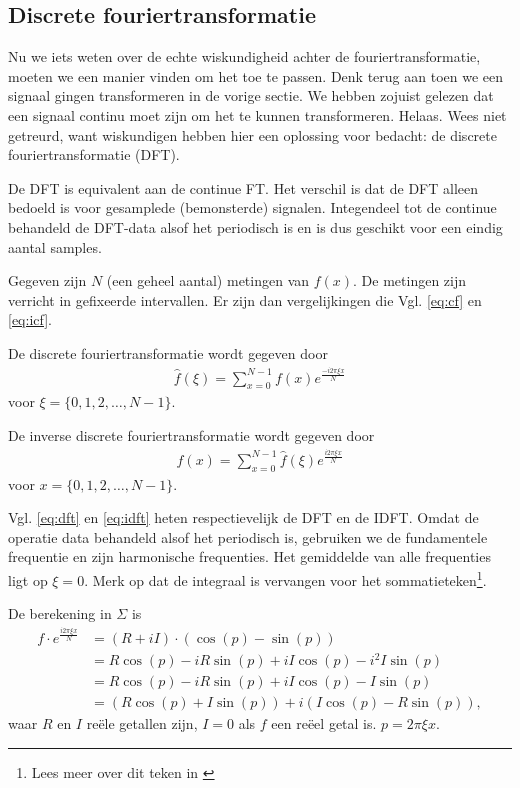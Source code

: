 \documentclass[11pt,fleqn]{book} %
\begin{document}
\subsection{Discrete fouriertransformatie}
Nu we iets weten over de echte wiskundigheid achter de fouriertransformatie, moeten we een manier vinden om het toe te passen. Denk terug aan toen we een signaal gingen transformeren in de vorige sectie. We hebben zojuist gelezen dat een signaal continu moet zijn om het te kunnen transformeren. Helaas. Wees niet getreurd, want wiskundigen hebben hier een oplossing voor bedacht: de discrete fouriertransformatie (DFT).

De DFT is equivalent aan de continue FT. Het verschil is dat de DFT alleen bedoeld is voor gesamplede (bemonsterde) signalen. Integendeel tot de continue behandeld de DFT-data alsof het periodisch is en is dus geschikt voor een eindig aantal samples.

Gegeven zijn $N$ (een geheel aantal) metingen van $f(x)$. De metingen zijn verricht in gefixeerde intervallen. Er zijn dan vergelijkingen die Vgl. \ref{eq:cf} en \ref{eq:icf}.
\begin{definition} \label{eq:dft}
De discrete fouriertransformatie wordt gegeven door
\begin{align}
\hat{f}(\xi)=\sum_{x=0}^{N-1} f(x)e^{\frac{-i2\pi \xi x}{N}}
\end{align}
voor $\xi=\{0, 1, 2, \ldots, N-1\}$.
\end{definition}
\begin{definition} \label{eq:idft}
De inverse discrete fouriertransformatie wordt gegeven door
\begin{align}
f(x)=\sum_{x=0}^{N-1} \hat{f}(\xi)e^{\frac{i2\pi \xi x}{N}}
\end{align}
voor $x=\{0, 1, 2, \ldots, N-1\}$.
\end{definition}


Vgl. \ref{eq:dft} en \ref{eq:idft} heten respectievelijk de DFT en de IDFT. Omdat de operatie data behandeld alsof het periodisch is, gebruiken we de fundamentele frequentie en zijn harmonische frequenties. Het gemiddelde van alle frequenties ligt op $\xi=0$. Merk op dat de integraal is vervangen voor het sommatieteken\footnote{Lees meer over dit teken in \cite{som}}.

De berekening in $\Sigma$ is
\begin{displaymath}
\begin{aligned}
f\cdot e^{\frac{i2\pi \xi x}{N}}&=(R+iI)\cdot(\cos{(p)}-\sin{(p)})\\
& = R\cos{(p)}-iR\sin{(p)}+iI\cos{(p)}-i^2I\sin{(p)}\\
& =R\cos{(p)}-iR\sin{(p)}+iI\cos{(p)}-I\sin{(p)}\\
& =(R\cos{(p)}+I\sin{(p)})+i(I\cos{(p)}-R\sin{(p)}),
\end{aligned}
\end{displaymath}
waar $R$ en $I$ reële getallen zijn, $I=0$ als $f$ een reëel getal is. $p=2\pi\xi x$.
\end{document}

